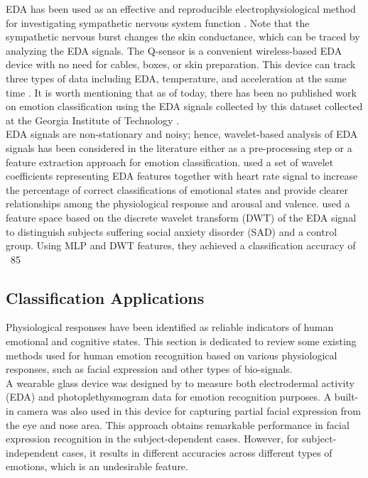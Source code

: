 EDA has been used as an effective and reproducible electrophysiological method for 
investigating sympathetic nervous system 
function \cite{WearableDevice2016, AssociationBetween2013, SympatheticSkin1984, PrincipalComponent2000}.
Note that the sympathetic nervous 
burst changes the skin conductance, which can be traced by analyzing the EDA 
signals\cite{SkinConduct2006, SympatheticSkin1981, DecodeChild2013}. The Q-sensor 
is a convenient wireless-based EDA device with no need for cables, boxes, or skin 
preparation. This device can track three types of data including EDA, temperature, 
and acceleration at the same time \cite{Validation2013}. It is worth mentioning that 
as of today, there has been no published work on emotion classification using the 
EDA signals collected by this dataset collected at the Georgia Institute of 
Technology \cite{DecodeChild2013}.\\

EDA signals are non-stationary and noisy; hence, wavelet-based analysis of EDA signals 
has been considered in the literature \cite{EmotionalState2013, EMGGSR2009}
either as a pre-processing step or a feature extraction approach for emotion classification. 
\cite{EmotionalState2013} used a set of wavelet coefficients representing EDA features 
together with heart rate signal to increase the percentage of correct classifications 
of emotional states and provide clearer relationships among the physiological response 
and arousal and valence. \cite{EDA2016} used a feature space based on the 
discrete wavelet transform (DWT) of the EDA signal to distinguish subjects suffering 
social anxiety disorder (SAD) and a control group. Using MLP and DWT features, they 
achieved a classification accuracy of ~85%

\subsection{Classification Applications}
Physiological responses have been identified as reliable indicators of human emotional 
and cognitive states. This section is dedicated to review some existing methods used for 
human emotion recognition based on various physiological responses, such as facial 
expression and other types of bio-signals. \\

A wearable glass device was designed by \cite{WearableDevice2016} to measure both electrodermal 
activity (EDA) and photoplethysmogram data for emotion recognition purposes. A built-in 
camera was also used in this device for capturing partial facial expression from the eye 
and nose area. This approach obtains remarkable performance in facial expression 
recognition in the subject-dependent cases. However, for subject-independent cases, 
it results in different accuracies across different types of emotions, which is an 
undesirable feature. \\

